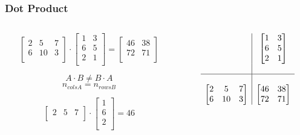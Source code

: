 \documentclass[10pt]{beamer}
\begin{document}
\begin{frame}[fragile]
  \frametitle{Dot Product}
  \begin{columns}
  \begin{column}{0.45\textwidth}
  \[
    \begin{bmatrix}
      2 & 5  & 7 \\
      6 & 10 & 3 \\
    \end{bmatrix}
    \cdot
    \begin{bmatrix}
    1 & 3 \\
    6 & 5 \\
    2 & 1 \\
    \end{bmatrix}
    =
    \begin{bmatrix}
      46 & 38 \\
      72 & 71 \\
  \end{bmatrix} \]

  \begin{shaded}
  \[ A\cdot B \neq B\cdot A \]
  \[ n_{colsA} = n_{rowsB}\]

  \end{shaded}

  \[
    \begin{bmatrix}
      2 & 5 & 7 \\
    \end{bmatrix}
    \cdot
    \begin{bmatrix}
      1 \\ 6 \\ 2 \\
    \end{bmatrix}
    = 46 \]

  \end{column}

  \begin{column}{0.45\textwidth}

  \[ \begin{array}{c|c}
        & \begin{bmatrix}
         1 & 3 \\
         6 & 5 \\
         2 & 1 \\
         \end{bmatrix} \\
          & \\
         \hline
          & \\
    \begin{bmatrix}
      2 & 5  & 7 \\
      6 & 10 & 3 \\
    \end{bmatrix} &
    \begin{bmatrix}
      46 & 38 \\
      72 & 71 \\
    \end{bmatrix}
    \\
    \end{array}
  \]
  \begin{snugshade}
  \begin{verbatim}


\end{verbatim}
\end{snugshade}
\end{column}
\end{columns}
\end{frame}
\end{document}
